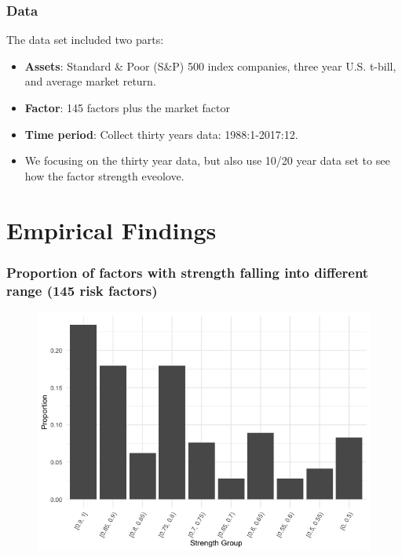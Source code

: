 \documentclass[12pt]{beamer}
\begin{document}
	\begin{frame}
	\frametitle{Data}
	The data set included two parts:
	\begin{itemize}
		\item {\bf Assets}: Standard \& Poor (S\&P) 500 index companies, three year U.S. t-bill, and average market return.\\
		\item {\bf Factor}:  145 factors plus the market factor \\
		
		\item \textbf{Time period}:	Collect thirty years data: 1988:1-2017:12.\\
		
		\item We focusing on the thirty year data, but also use 10/20 year data set to see how the factor strength eveolove.\\
	\end{itemize}		
\end{frame}

\section{Empirical Findings}

\begin{frame}[plain]
\frametitle{Proportion of factors with strength falling into different range (145 risk factors)}
\begin{figure}
        \includegraphics[scale = 0.45]{figure/30_strength.png}
\end{figure}
\end{frame}
\end{document}
